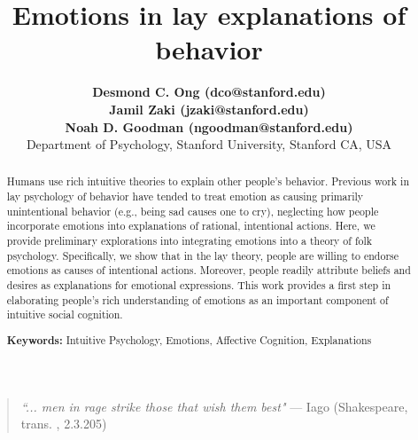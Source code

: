 \documentclass[10pt,letterpaper]{article}
\title{ Emotions in lay explanations of behavior}
\author{{\large \bf Desmond C. Ong (dco@stanford.edu)} \\
{\large \bf Jamil Zaki (jzaki@stanford.edu)} \\
{\large \bf Noah D. Goodman (ngoodman@stanford.edu)} \\
  Department of Psychology, Stanford University, Stanford CA, USA 
}
\newcommand{\red}[1]{\textcolor{Red}{#1}}
\newcommand{\ndg}[1]{\textcolor{Green}{[ndg: #1]}}
\begin{document}
\maketitle

\begin{abstract}
Humans use rich intuitive theories to explain other people's behavior. Previous work in lay psychology of behavior have tended to treat emotion as causing primarily unintentional behavior (e.g., being sad causes one to cry), neglecting how people incorporate emotions into explanations of rational, intentional actions. Here, we provide preliminary explorations into integrating emotions into a theory of folk psychology. Specifically, we show that in the lay theory, people are willing to endorse emotions as causes of intentional actions. Moreover, people readily attribute beliefs and desires as explanations for emotional expressions. This work provides a first step in elaborating people's rich understanding of emotions as an important component of intuitive social cognition.

\textbf{Keywords:} 
Intuitive Psychology, Emotions, Affective Cognition, Explanations
\end{abstract}








\begin{quote}
\textit{``... men in rage strike those that wish them best"} 
--- Iago (Shakespeare, trans. , 2.3.205) %
\end{quote}



\end{document}
